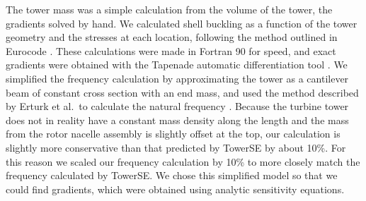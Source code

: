 The tower mass was a simple calculation from the volume of the tower, the gradients solved by hand.
We calculated shell buckling as a function of the tower geometry and the stresses at each location, following the method outlined in Eurocode \citep{en19931}. These calculations were made in Fortran 90 for speed, and exact gradients were obtained with the Tapenade automatic differentiation tool \citep{hascoet2013tapenade}. We simplified the frequency calculation by approximating the tower as a cantilever beam of constant cross section with an end mass, and used the method described by Erturk et al.\ to calculate the natural frequency \citep{erturk2011appendix}. Because the turbine tower does not in reality 
have a constant mass density along the length and the mass from the rotor nacelle assembly is slightly offset at the top, our calculation is slightly more conservative than that predicted by TowerSE by about 10\%. 
For this reason we scaled our frequency calculation by 10\% to more closely match the frequency calculated by TowerSE. We chose this simplified model so that we could find gradients, which were obtained using analytic sensitivity equations. 